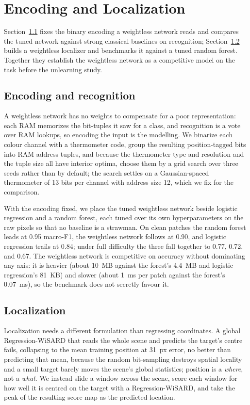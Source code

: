 \section{Encoding and Localization}
\label{sec:encoding}

Section~\ref{sec:enc-recog} fixes the binary encoding a weightless network reads and compares the tuned network against strong classical baselines on recognition; Section~\ref{sec:enc-loc} builds a weightless localizer and benchmarks it against a tuned random forest. Together they establish the weightless network as a competitive model on the task before the unlearning study.

\subsection{Encoding and recognition}
\label{sec:enc-recog}

A weightless network has no weights to compensate for a poor representation: each RAM memorizes the bit-tuples it saw for a class, and recognition is a vote over RAM lookups, so encoding the input is the modelling. We binarize each colour channel with a thermometer code, group the resulting position-tagged bits into RAM address tuples, and because the thermometer type and resolution and the tuple size all have interior optima, choose them by a grid search over three seeds rather than by default; the search settles on a Gaussian-spaced thermometer of 13 bits per channel with address size 12, which we fix for the comparison.

With the encoding fixed, we place the tuned weightless network beside logistic regression and a random forest, each tuned over its own hyperparameters on the raw pixels so that no baseline is a strawman. On clean patches the random forest leads at 0.95 macro-F1, the weightless network follows at 0.90, and logistic regression trails at 0.84; under full difficulty the three fall together to 0.77, 0.72, and 0.67. The weightless network is competitive on accuracy without dominating any axis: it is heavier (about 10~MB against the forest's 4.4~MB and logistic regression's 81~KB) and slower (about 1~ms per patch against the forest's 0.07~ms), so the benchmark does not secretly favour it.

\subsection{Localization}
\label{sec:enc-loc}

Localization needs a different formulation than regressing coordinates. A global Regression-WiSARD that reads the whole scene and predicts the target's centre fails, collapsing to the mean training position at 31~px error, no better than predicting that mean, because the random bit-sampling destroys spatial locality and a small target barely moves the scene's global statistics; position is a \emph{where}, not a \emph{what}. We instead slide a window across the scene, score each window for how well it is centred on the target with a Regression-WiSARD, and take the peak of the resulting score map as the predicted location.

